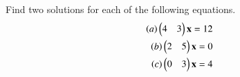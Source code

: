Find two solutions for each of the following equations.
\begin{align}
\left(a\right) \begin{pmatrix}4&3\end{pmatrix}\mathbf{x}=12
\label{eq:pointonline1}
\\
\left(b\right) \begin{pmatrix}2&5\end{pmatrix}\mathbf{x}=0
\label{eq:pointonline2}
\\
\left(c\right) \begin{pmatrix}0&3\end{pmatrix}\mathbf{x}=4
\label{eq:pointonline3}
\end{align}
